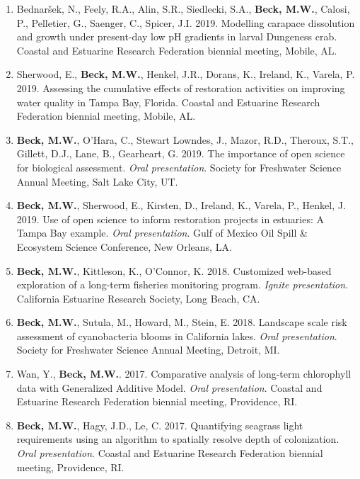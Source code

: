 \documentclass[letterpaper,12pt]{article}
\begin{document}
\begin{enumerate}
\item Bednar\v{s}ek, N., Feely, R.A., Alin, S.R., Siedlecki, S.A., \textbf{Beck, M.W.}, Calosi, P., Pelletier, G., Saenger, C., Spicer, J.I. 2019. Modelling carapace dissolution and growth under present-day low pH gradients in larval Dungeness crab.  Coastal and Estuarine Research Federation biennial meeting, Mobile, AL.

\item Sherwood, E., \textbf{Beck, M.W.}, Henkel, J.R., Dorans, K., Ireland, K., Varela, P. 2019. Assessing the cumulative effects of restoration activities on improving water quality in Tampa Bay, Florida.  Coastal and Estuarine Research Federation biennial meeting, Mobile, AL.

\item \textbf{Beck, M.W.}, O'Hara, C., Stewart Lowndes, J., Mazor, R.D., Theroux, S.T., Gillett, D.J., Lane, B., Gearheart, G. 2019. The importance of open science for biological assessment. \textit{Oral presentation}. Society for Freshwater Science Annual Meeting, Salt Lake City, UT.

\item {\bf Beck, M.W.}, Sherwood, E., Kirsten, D., Ireland, K., Varela, P., Henkel, J. 2019. Use of open science to inform restoration projects in estuaries: A Tampa Bay example. \textit{Oral presentation}. Gulf of Mexico Oil Spill \& Ecosystem Science Conference, New Orleans, LA.

\item {\bf Beck, M.W.}, Kittleson, K., O'Connor, K. 2018. Customized web-based exploration of a long-term fisheries monitoring program. \textit{Ignite presentation}. California Estuarine Research Society, Long Beach, CA.

\item {\bf Beck, M.W.}, Sutula, M., Howard, M., Stein, E. 2018. Landscape scale risk assessment of cyanobacteria blooms in California lakes. \textit{Oral presentation}. Society for Freshwater Science Annual Meeting, Detroit, MI.

\item Wan, Y., {\bf Beck, M.W.}. 2017. Comparative analysis of long-term chlorophyll data with Generalized Additive Model. \textit{Oral presentation}. Coastal and Estuarine Research Federation biennial meeting, Providence, RI.

\item {\bf Beck, M.W.}, Hagy, J.D., Le, C. 2017. Quantifying seagrass light requirements using an algorithm to spatially resolve depth of colonization. \textit{Oral presentation}. Coastal and Estuarine Research Federation biennial meeting, Providence, RI.


\end{enumerate}
\end{document}
